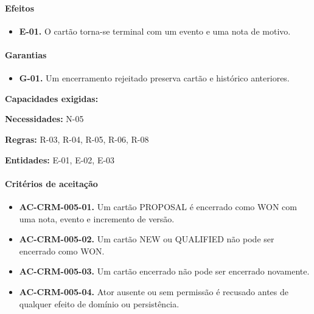 \documentclass[10pt,a4paper]{article}
\begin{document}
\paragraph{Efeitos}

\begin{itemize}

\item \textbf{E-01.} O cartão torna-se terminal com um evento e uma nota de motivo.

\end{itemize}

\paragraph{Garantias}

\begin{itemize}

\item \textbf{G-01.} Um encerramento rejeitado preserva cartão e histórico anteriores.

\end{itemize}

\textbf{Capacidades exigidas:} 

\textbf{Necessidades:} N-05

\textbf{Regras:} R-03, R-04, R-05, R-06, R-08

\textbf{Entidades:} E-01, E-02, E-03

\paragraph{Critérios de aceitação}

\begin{itemize}

\item \textbf{AC-CRM-005-01.} Um cartão PROPOSAL é encerrado como WON com uma nota, evento e incremento de versão.

\item \textbf{AC-CRM-005-02.} Um cartão NEW ou QUALIFIED não pode ser encerrado como WON.

\item \textbf{AC-CRM-005-03.} Um cartão encerrado não pode ser encerrado novamente.

\item \textbf{AC-CRM-005-04.} Ator ausente ou sem permissão é recusado antes de qualquer efeito de domínio ou persistência.

\end{itemize}
\end{document}
